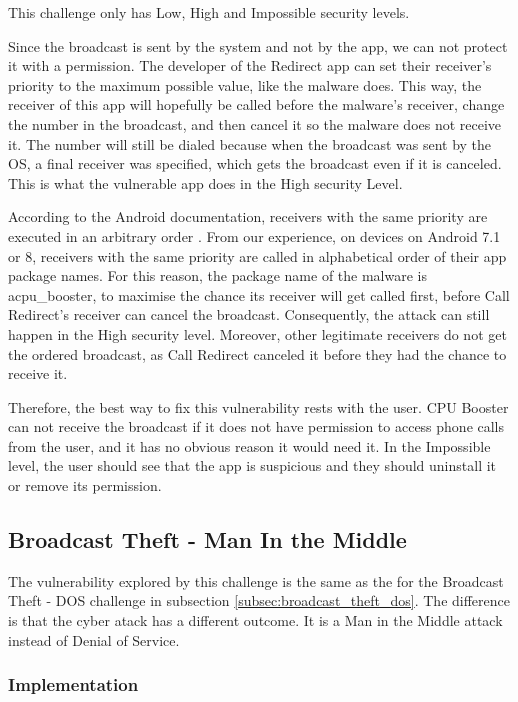     This challenge only has Low, High and Impossible security levels.
        
    Since the broadcast is sent by the system and not by the app, we can not protect it with a
    permission. The developer of the Redirect app can set their receiver's priority to the maximum possible value, like the malware does. This way, the receiver of this app will hopefully be called before the malware's receiver, change the number in the broadcast, and then cancel it so the malware does not receive it. The number will still be dialed because when the broadcast was sent by the OS, a final receiver was specified, which gets the broadcast even if it is canceled. This is what the vulnerable app does in the High security Level.

    According to the Android documentation, receivers with the same priority are executed in an arbitrary order \cite{broadcasts_overview}. From our experience, on devices on Android 7.1 or 8, receivers with the same priority are called in alphabetical order of their app package names. For this reason, the package name of the malware is acpu\_booster, to maximise the chance its receiver will get called first, before Call Redirect's receiver can cancel the broadcast. Consequently, the attack can still happen in the High security level. Moreover, other legitimate receivers do not get the ordered broadcast, as Call Redirect canceled it before they had the chance to receive it.

    Therefore, the best way to fix this vulnerability rests with the user. CPU Booster can not receive the broadcast if it does not have permission to access phone calls from the user, and it has no obvious reason it would need it. In the Impossible level, the user should see that the app is suspicious and they should uninstall it or remove its permission. 
    
    \subsection{Broadcast Theft - Man In the Middle}
        \label{subsec:broadcast_theft_mitm}
        
    The vulnerability explored by this challenge is the same as the for the Broadcast Theft - DOS challenge in subsection \ref{subsec:broadcast_theft_dos}. The difference is that the cyber atack has a different outcome. It is a Man in the Middle attack instead of Denial of Service.
    
    \subsubsection{Implementation}
        \label{subsubsec:broadcast_theft_mitm_implementation}

